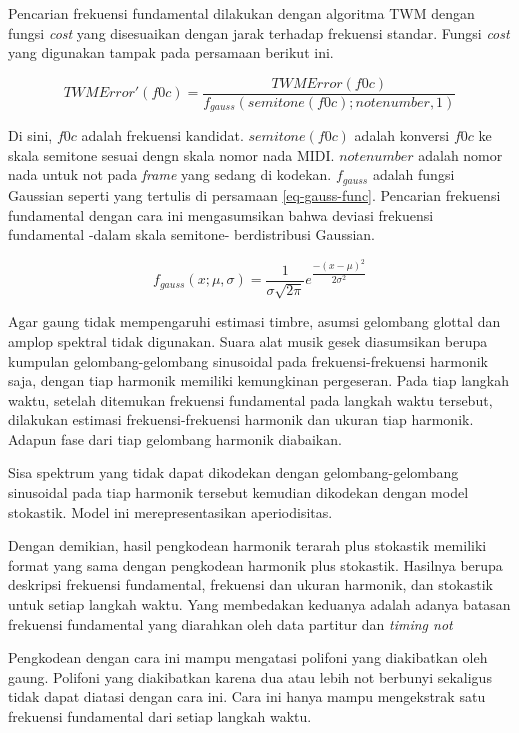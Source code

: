Pencarian frekuensi fundamental dilakukan dengan algoritma TWM dengan fungsi \textit{cost} yang disesuaikan dengan jarak terhadap frekuensi standar. Fungsi \textit{cost} yang digunakan tampak pada persamaan berikut ini.

\begin{equation}
  TWMError'(f0c) = \dfrac{TWMError(f0c)}{f_{gauss}(semitone(f0c);notenumber,1)}
\end{equation}

Di sini, $f0c$ adalah frekuensi kandidat. $semitone(f0c)$ adalah konversi $f0c$ ke skala semitone sesuai dengn skala nomor nada MIDI. $notenumber$ adalah nomor nada untuk not pada \textit{frame} yang sedang di kodekan. $f_{gauss}$ adalah fungsi Gaussian seperti yang tertulis di persamaan \ref{eq-gauss-func}. Pencarian frekuensi fundamental dengan cara ini mengasumsikan bahwa deviasi frekuensi fundamental -dalam skala semitone- berdistribusi Gaussian.

\begin{equation}
 f_{gauss}(x;\mu,\sigma) = \dfrac{1}{\sigma \sqrt{2\pi}}e^{\dfrac{-(x-\mu)^2}{2 \sigma^2}} \label{eq-gauss-func}
\end{equation}

Agar gaung tidak mempengaruhi estimasi timbre, asumsi gelombang glottal dan amplop spektral tidak digunakan. Suara alat musik gesek diasumsikan berupa kumpulan gelombang-gelombang sinusoidal pada frekuensi-frekuensi harmonik saja, dengan tiap harmonik memiliki kemungkinan pergeseran. Pada tiap langkah waktu, setelah ditemukan frekuensi fundamental pada langkah waktu tersebut, dilakukan estimasi frekuensi-frekuensi harmonik dan ukuran tiap harmonik. Adapun fase dari tiap gelombang harmonik diabaikan.

Sisa spektrum yang tidak dapat dikodekan dengan gelombang-gelombang sinusoidal pada tiap harmonik tersebut kemudian dikodekan dengan model stokastik. Model ini merepresentasikan aperiodisitas.

Dengan demikian, hasil pengkodean harmonik terarah plus stokastik memiliki format yang sama dengan pengkodean harmonik plus stokastik. Hasilnya berupa deskripsi frekuensi fundamental, frekuensi dan ukuran harmonik, dan stokastik untuk setiap langkah waktu. Yang membedakan keduanya adalah adanya batasan frekuensi fundamental yang diarahkan oleh data partitur dan \textit{timing not}

Pengkodean dengan cara ini mampu mengatasi polifoni yang diakibatkan oleh gaung. Polifoni yang diakibatkan karena dua atau lebih not berbunyi sekaligus tidak dapat diatasi dengan cara ini. Cara ini hanya mampu mengekstrak satu frekuensi fundamental dari setiap langkah waktu.


